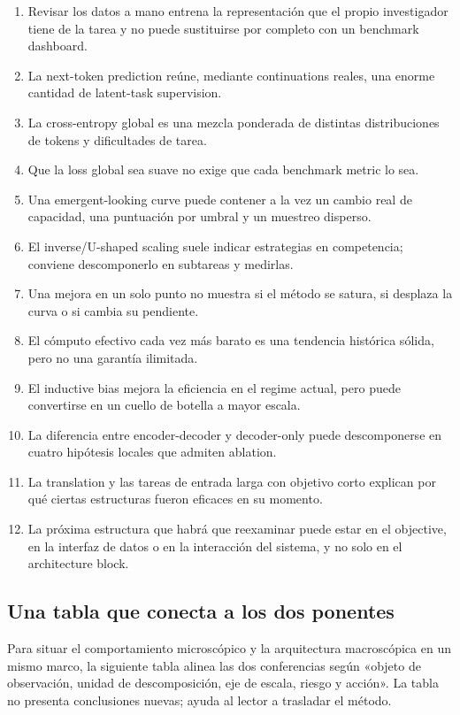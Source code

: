 \begin{enumerate}
  \item Revisar los datos a mano entrena la representación que el propio investigador tiene de la tarea y no puede sustituirse por completo con un benchmark dashboard.
  \item La next-token prediction reúne, mediante continuations reales, una enorme cantidad de latent-task supervision.
  \item La cross-entropy global es una mezcla ponderada de distintas distribuciones de tokens y dificultades de tarea.
  \item Que la loss global sea suave no exige que cada benchmark metric lo sea.
  \item Una emergent-looking curve puede contener a la vez un cambio real de capacidad, una puntuación por umbral y un muestreo disperso.
  \item El inverse/U-shaped scaling suele indicar estrategias en competencia; conviene descomponerlo en subtareas y medirlas.
  \item Una mejora en un solo punto no muestra si el método se satura, si desplaza la curva o si cambia su pendiente.
  \item El cómputo efectivo cada vez más barato es una tendencia histórica sólida, pero no una garantía ilimitada.
  \item El inductive bias mejora la eficiencia en el regime actual, pero puede convertirse en un cuello de botella a mayor escala.
  \item La diferencia entre encoder-decoder y decoder-only puede descomponerse en cuatro hipótesis locales que admiten ablation.
  \item La translation y las tareas de entrada larga con objetivo corto explican por qué ciertas estructuras fueron eficaces en su momento.
  \item La próxima estructura que habrá que reexaminar puede estar en el objective, en la interfaz de datos o en la interacción del sistema, y no solo en el architecture block.
\end{enumerate}

\subsection{Una tabla que conecta a los dos ponentes}

Para situar el comportamiento microscópico y la arquitectura macroscópica en un mismo marco, la siguiente tabla alinea las dos conferencias según «objeto de observación, unidad de descomposición, eje de escala, riesgo y acción». La tabla no presenta conclusiones nuevas; ayuda al lector a trasladar el método.

